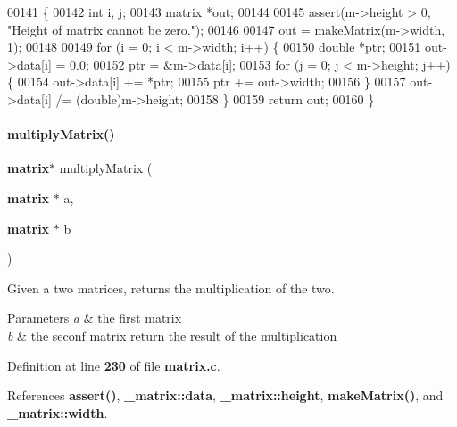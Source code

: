 \begin{DoxyCode}
00141                               \{
00142   \textcolor{keywordtype}{int} i, j;
00143   matrix *out;
00144 
00145   assert(m->height > 0, \textcolor{stringliteral}{"Height of matrix cannot be zero."});
00146 
00147   out = makeMatrix(m->width, 1);
00148 
00149   \textcolor{keywordflow}{for} (i = 0; i < m->width; i++) \{
00150     \textcolor{keywordtype}{double} *ptr;
00151     out->data[i] = 0.0;
00152     ptr = &m->data[i];
00153     \textcolor{keywordflow}{for} (j = 0; j < m->height; j++) \{
00154       out->data[i] += *ptr;
00155       ptr += out->width;
00156     \}
00157     out->data[i] /= (double)m->height;
00158   \}
00159   \textcolor{keywordflow}{return} out;
00160 \}
\end{DoxyCode}
\mbox{\label{a00125_a63ed5c518b34768e9ef8e9d5f7d0b534}} 
\paragraph{multiply\+Matrix()}
{\footnotesize\ttfamily \textbf{ matrix}$\ast$ multiply\+Matrix (\begin{DoxyParamCaption}\item[{\textbf{ matrix} $\ast$}]{a,  }\item[{\textbf{ matrix} $\ast$}]{b }\end{DoxyParamCaption})}



Given a two matrices, returns the multiplication of the two. 


\begin{DoxyParams}{Parameters}
{\em a} & the first matrix \\
\hline
{\em b} & the seconf matrix return the result of the multiplication \\
\hline
\end{DoxyParams}


Definition at line \textbf{ 230} of file \textbf{ matrix.\+c}.



References \textbf{ assert()}, \textbf{ \+\_\+matrix\+::data}, \textbf{ \+\_\+matrix\+::height}, \textbf{ make\+Matrix()}, and \textbf{ \+\_\+matrix\+::width}.


